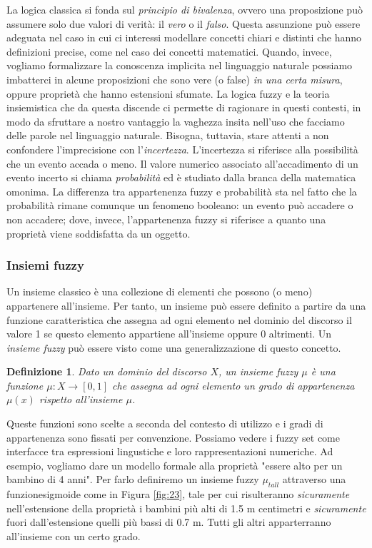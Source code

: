 \documentclass[10pt,a4paper]{article}
\newtheorem{definition}{Definizione}
\begin{document}
La logica classica si fonda sul \emph{principio di bivalenza}, ovvero una proposizione può assumere solo due valori di verità: il \emph{vero} o il \emph{falso}. Questa assunzione può essere adeguata nel caso in cui ci interessi modellare concetti chiari e distinti che hanno definizioni precise, come nel caso dei concetti matematici. Quando, invece, vogliamo formalizzare la conoscenza implicita nel linguaggio naturale possiamo imbatterci in alcune proposizioni che sono vere (o false) \emph{in una certa misura}, oppure proprietà che hanno estensioni sfumate. La logica fuzzy e la teoria insiemistica che da questa discende ci permette di ragionare in questi contesti, in modo da sfruttare a nostro vantaggio la vaghezza insita nell'uso che facciamo delle parole nel linguaggio naturale. Bisogna, tuttavia, stare attenti a non confondere l'imprecisione con l'\emph{incertezza}. L'incertezza si riferisce alla possibilità che un evento accada o meno. Il valore numerico associato all'accadimento di un evento incerto si chiama \emph{probabilità} ed è studiato dalla branca della matematica omonima. La differenza tra appartenenza fuzzy e probabilità sta nel fatto che la probabilità rimane comunque un fenomeno booleano: un evento può accadere o non accadere; dove, invece, l'appartenenza fuzzy si riferisce a quanto una proprietà viene soddisfatta da un oggetto. 

\subsubsection{Insiemi fuzzy}

Un insieme classico è una collezione di elementi che possono (o meno) appartenere all'insieme. Per tanto, un insieme può essere definito a partire da una funzione caratteristica che assegna ad ogni elemento nel dominio del discorso il valore 1 se questo elemento appartiene all'insieme oppure 0 altrimenti. Un 	\emph{insieme fuzzy} può essere visto come una generalizzazione di questo concetto.
\begin{definition}
 Dato un dominio del discorso $X$, un insieme fuzzy $\mu$ è una funzione $\mu : X \to [0,1]$ che assegna ad ogni elemento un \emph{grado di appartenenza} $\mu(x)$ rispetto all'insieme $\mu$.
\end{definition}
 Queste funzioni sono scelte a seconda del contesto di utilizzo e i gradi di appartenenza sono fissati per convenzione. Possiamo vedere i fuzzy set come interfacce tra espressioni lingustiche e loro rappresentazioni numeriche. Ad esempio, vogliamo dare un modello formale alla proprietà "essere alto per un bambino di 4 anni". Per farlo definiremo un insieme fuzzy $\mu_{tall}$ attraverso una funzionesigmoide come in Figura \ref{fig:23}, tale per cui risulteranno \emph{sicuramente} nell'estensione della proprietà i bambini più alti di 1.5 m centimetri e \emph{sicuramente} fuori dall'estensione quelli più bassi di 0.7 m. Tutti gli altri apparterranno all'insieme con un certo grado.
\end{document}
